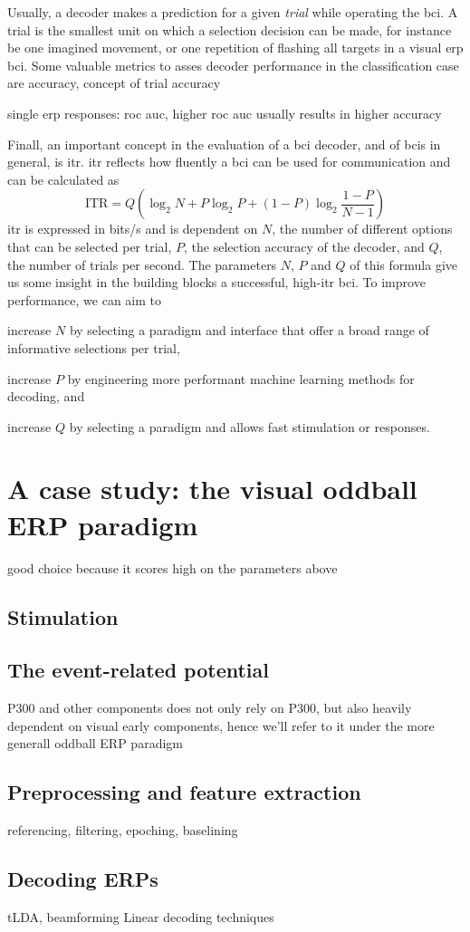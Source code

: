Usually, a decoder makes a prediction for a given \emph{trial} while operating
the \ac{bci}.
A trial is the smallest unit on which a selection decision can be made, for
instance be one imagined movement, or one repetition of flashing all targets
in a visual \ac{erp} \ac{bci}.
Some valuable metrics to asses decoder performance in the classification case
are accuracy,
concept of trial
accuracy

single erp responses: roc auc, higher roc auc usually results in higher
accuracy

Finall, an important concept in the evaluation of a \ac{bci} decoder, and of \acp{bci}
in general, is \ac{itr}.
\Ac{itr} reflects how fluently a \ac{bci} can be used for communication and can
be calculated as
\begin{equation}
	\text{ITR} = Q\left(\log_2N+P\log_2P+(1-P)\log_2\frac{1-P}{N-1}\right)
\end{equation}
\Ac{itr} is expressed in bits/s and is dependent on $N$, the number of
different options that can be selected per trial, $P$, the selection accuracy
of the decoder, and $Q$, the number of trials per second.
The parameters $N$, $P$ and $Q$ of this formula give us some insight in the
building blocks a successful, high-\ac{itr} \ac{bci}.
To improve performance, we can aim to
\begin{enumerate*}[label={\arabic*})]
\item increase $N$ by selecting a paradigm and interface that offer a
broad range of informative selections per trial,
\item increase $P$ by engineering more performant machine learning methods for
decoding, and
\item increase $Q$ by selecting a paradigm and allows fast stimulation or
responses.
\end{enumerate*}


\section{A case study: the visual oddball ERP paradigm}
good choice because it scores high on the parameters above
\subsection{Stimulation}
\subsection{The event-related potential}
P300 and other components
does not only rely on P300, but also heavily dependent on visual early
components, hence we'll refer to it under the more generall oddball ERP
paradigm
\subsection{Preprocessing and feature extraction}
referencing, filtering, epoching, baselining
\subsection{Decoding ERPs}
tLDA, beamforming
Linear decoding techniques
